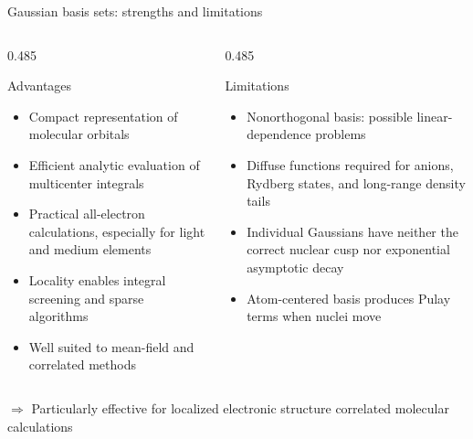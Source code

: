 \documentclass[aspectratio=169,9pt]{beamer}
\newcommand{\red}[1]{\textcolor{hfRed}{#1}}
\newcommand{\green}[1]{\textcolor{hfGreen}{#1}}
\newcommand{\cmark}{\textbf{\green{\ding{51}}}}
\newcommand{\xmark}{\textbf{\red{\ding{55}}}}
\begin{document}
\begin{frame}{Gaussian basis sets: strengths and limitations}
	\begin{center}
	\end{center}
	\begin{columns}[T,onlytextwidth]
		\begin{column}{0.485\textwidth}
			\begin{block}{Advantages}
				\begin{itemize}
					\item[$\cmark$] Compact representation of molecular orbitals
					\item[$\cmark$] Efficient analytic evaluation of multicenter
					      integrals
					\item[$\cmark$] Practical all-electron calculations, especially
					      for light and medium elements
					\item[$\cmark$] Locality enables integral screening and
					      sparse algorithms
					\item[$\cmark$] Well suited to mean-field and
					      correlated methods
				\end{itemize}
			\end{block}
		\end{column}
		\begin{column}{0.485\textwidth}
			\begin{block}{Limitations}
				\begin{itemize}
					\item[$\xmark$] Nonorthogonal basis:
					      possible linear-dependence problems
					\item[$\xmark$] Diffuse functions required for anions,
					      Rydberg states, and long-range density tails
					\item[$\xmark$] Individual Gaussians have neither the correct
					      nuclear cusp nor exponential asymptotic decay
					\item[$\xmark$] Atom-centered basis produces Pulay terms when
					      nuclei move
				\end{itemize}
			\end{block}
		\end{column}
	\end{columns}
	\vfill
	\centering
	$\Rightarrow$ \alert{Particularly effective for localized electronic structure correlated molecular calculations}
\end{frame}
\end{document}
